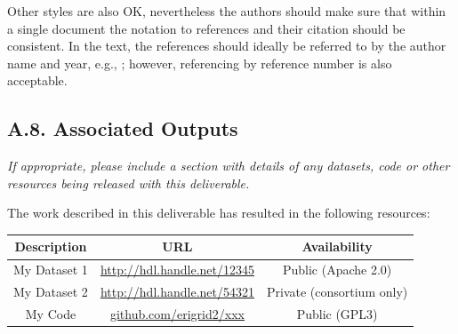 Other styles are also OK, nevertheless the authors should make sure that within a single document the notation to references and their citation should be consistent. In the text, the references should ideally be referred to by the author name and year, e.g., \cite{bib:lamport1994}; however, referencing by reference number is also acceptable.

\subsection*{A.8. Associated Outputs}
\label{sec:appendix-a8-associated-outputs}

\textit{If appropriate, please include a section with details of any datasets, code or other resources being released with this deliverable.}

The work described in this deliverable has resulted in the following resources:

\begin{center}
    \def\arraystretch{1.25}		
    \begin{tabular}{|c|c|c|}
        \hline
        \rowcolor{erigrid2gray}
        \color{white} Description & 
        \color{white} URL & 
        \color{white} Availability 
        \\\hline
    
        \rowcolor{white}\color{erigrid2font} 
        My Dataset 1 &  
        \url{http://hdl.handle.net/12345} &
        Public (Apache 2.0) \\
    
        \rowcolor{erigrid2lightergray}\color{erigrid2font} 
        My Dataset 2 &  
        \url{http://hdl.handle.net/54321} &
        Private (consortium only) \\
    
        \rowcolor{white}\color{erigrid2font} 
        My Code &  
        \url{github.com/erigrid2/xxx} &
        Public (GPL3) \\
    
        \hline
    \end{tabular}
\end{center}

